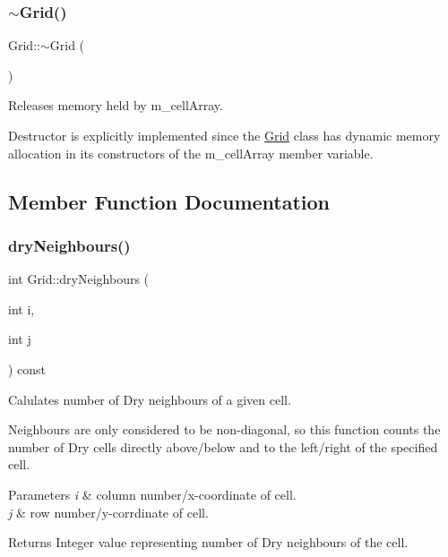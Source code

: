 \subsubsection{\texorpdfstring{$\sim$\+Grid()}{~Grid()}}
{\footnotesize\ttfamily Grid\+::$\sim$\+Grid (\begin{DoxyParamCaption}{ }\end{DoxyParamCaption})}



Releases memory held by m\+\_\+cell\+Array. 

Destructor is explicitly implemented since the \hyperlink{class_grid}{Grid} class has dynamic memory allocation in its constructors of the m\+\_\+cell\+Array member variable. 

\subsection{Member Function Documentation}
\mbox{\label{class_grid_a50f4c0db20b466c84a1d65004e51642e}} 
\subsubsection{\texorpdfstring{dry\+Neighbours()}{dryNeighbours()}}
{\footnotesize\ttfamily int Grid\+::dry\+Neighbours (\begin{DoxyParamCaption}\item[{int}]{i,  }\item[{int}]{j }\end{DoxyParamCaption}) const}



Calulates number of Dry neighbours of a given cell. 

Neighbours are only considered to be non-\/diagonal, so this function counts the number of Dry cells directly above/below and to the left/right of the specified cell.


\begin{DoxyParams}{Parameters}
{\em i} & column number/x-\/coordinate of cell. \\
\hline
{\em j} & row number/y-\/corrdinate of cell.\\
\hline
\end{DoxyParams}
\begin{DoxyReturn}{Returns}
Integer value representing number of Dry neighbours of the cell. 
\end{DoxyReturn}
\mbox{\label{class_grid_aee0114021b6858483965cc1bffd7b88b}} 
